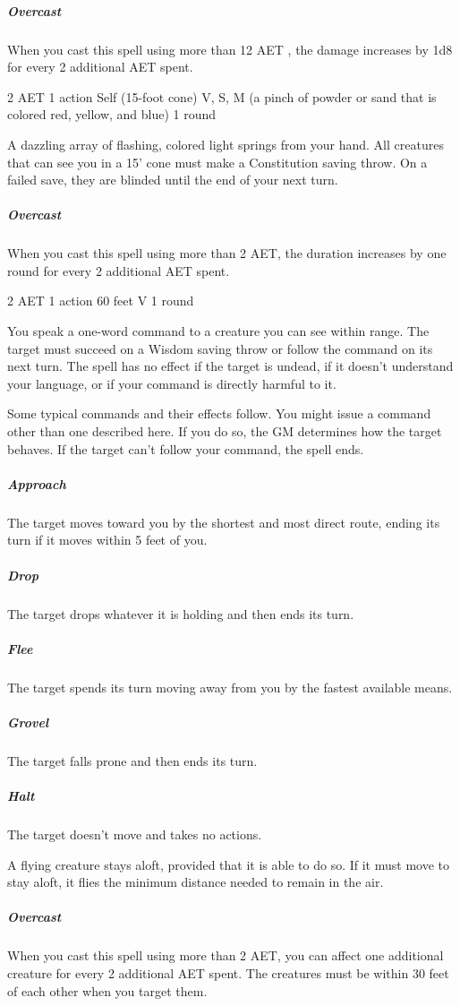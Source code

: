 \subparagraph*{Overcast} When you cast this spell using more than 12 AET , the damage increases by 1d8 for every 2 additional AET spent.


{2 AET}
{1 action}
{Self (15-foot cone)}
{V, S, M (a pinch of powder or sand that is colored red, yellow, and blue)}
{1 round}

A dazzling array of flashing, colored light springs from your hand. All creatures that can see you in a 15' cone must make a Constitution saving throw. On a failed save, they are blinded until the end of your next turn. 

\subparagraph*{Overcast} When you cast this spell using more than 2 AET, the duration increases by one round for every 2 additional AET spent.


{2 AET}
{1 action}
{60 feet}
{V}
{1 round}

You speak a one-word command to a creature you can see within range. The target must succeed on a Wisdom saving throw or follow the command on its next turn. The spell has no effect if the target is undead, if it doesn't understand your language, or if your command is directly harmful to it.

Some typical commands and their effects follow. You might issue a command other than one described here. If you do so, the GM determines how the target behaves. If the target can't follow your command, the spell ends.

\subparagraph*{Approach} The target moves toward you by the shortest and most direct route, ending its turn if it moves within 5 feet of you.

\subparagraph*{Drop} The target drops whatever it is holding and then ends its turn.

\subparagraph*{Flee} The target spends its turn moving away from you by the fastest available means.

\subparagraph*{Grovel} The target falls prone and then ends its turn.

\subparagraph*{Halt} The target doesn't move and takes no actions.

A flying creature stays aloft, provided that it is able to do so. If it must move to stay aloft, it flies the minimum distance needed to remain in the air.

\subparagraph*{Overcast} When you cast this spell using more than 2 AET, you can affect one additional creature for every 2 additional AET spent. The creatures must be within 30 feet of each other when you target them.


